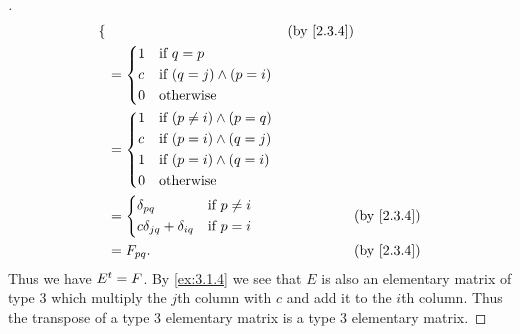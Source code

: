 \begin{proof}[]
\begin{align*}
\begin{dcases}
                                                              \end{dcases}             &  & \by{2.3.4}                             \\
                                                          & = \begin{dcases}
                                                                1 & \text{if } q = p                 \\
                                                                c & \text{if } (q = j) \land (p = i) \\
                                                                0 & \text{otherwise}
                                                              \end{dcases}                                 \\
                                                          & = \begin{dcases}
                                                                1 & \text{if } (p \neq i) \land (p = q) \\
                                                                c & \text{if } (p = i) \land (q = j)    \\
                                                                1 & \text{if } (p = i) \land (q = i)    \\
                                                                0 & \text{otherwise}
                                                              \end{dcases}                              \\
                                                          & = \begin{dcases}
                                                                \delta_{p q}                  & \text{if } p \neq i \\
                                                                c \delta_{j q} + \delta_{i q} & \text{if } p = i
                                                              \end{dcases} &  & \by{2.3.4}                  \\
                                                          & = F_{p q}.                                             &  & \by{2.3.4}
  \end{align*}
  Thus we have \({E}^{t} = F\).
  By \cref{ex:3.1.4} we see that \(E\) is also an elementary matrix of type 3 which multiply the \(j\)th column with \(c\) and add it to the \(i\)th column.
  Thus the transpose of a type 3 elementary matrix is a type 3 elementary matrix.
\end{proof}

